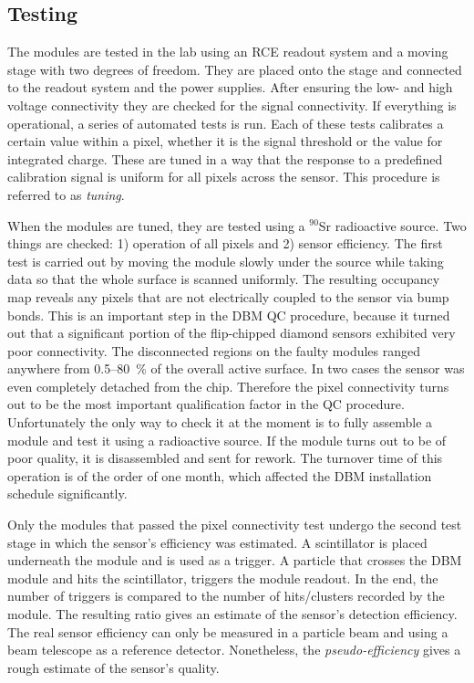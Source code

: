 \subsection{Testing}
The modules are tested in the lab using an RCE readout system and a moving stage with two degrees of freedom. They are placed onto the stage and connected to the readout system and the power supplies. After ensuring the low- and high voltage connectivity they are checked for the signal connectivity. If everything is operational, a series of automated tests is run. Each of these tests calibrates a certain value within a pixel, whether it is the signal threshold or the value for integrated charge. These are tuned in a way that the response to a predefined calibration signal is uniform for all pixels across the sensor. This procedure is referred to as \emph{tuning}. 

When the modules are tuned, they are tested using a $^{90}$Sr radioactive source. Two things are checked: 1) operation of all pixels and 2) sensor efficiency. The first test is carried out by moving the module slowly under the source while taking data so that the whole surface is scanned uniformly. The resulting occupancy map reveals any pixels that are not electrically coupled to the sensor via bump bonds. This is an important step in the DBM QC procedure, because it turned out that a significant portion of the flip-chipped diamond sensors exhibited very poor connectivity. The disconnected regions on the faulty modules ranged anywhere from 0.5--80~\% of the overall active surface. In two cases the sensor was even completely detached from the chip. Therefore the pixel connectivity turns out to be the most important qualification factor in the QC procedure. Unfortunately the only way to check it at the moment is to fully assemble a module and test it using a radioactive source. If the module turns out to be of poor quality, it is disassembled and sent for rework. The turnover time of this operation is of the order of one month, which affected the DBM installation schedule significantly. 

Only the modules that passed the pixel connectivity test undergo the second test stage in which the sensor's efficiency was estimated. A scintillator is placed underneath the module and is used as a trigger. A particle that crosses the DBM module and hits the scintillator, triggers the module readout. In the end, the number of triggers is compared to the number of hits/clusters recorded by the module. The resulting ratio gives an estimate of the sensor's detection efficiency. The real sensor efficiency can only be measured in a particle beam and using a beam telescope as a reference detector. Nonetheless, the \emph{pseudo-efficiency} gives a rough estimate of the sensor's quality. 

